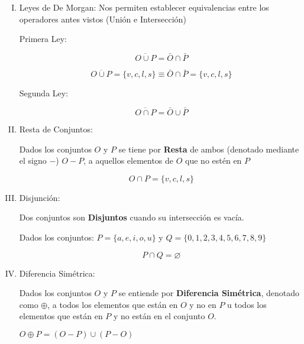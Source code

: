 \begin{enumerate}[I.]
{}\item Leyes de De Morgan: Nos permiten establecer equivalencias entre los 
operadores antes vistos (Unión e Intersección){

 Primera Ley:

\begin{equation}
\overline{O \cup P} = \bar{O} \cap \bar{P}
\end{equation}

\begin{equation}
\overline{O \cup P} = \{v,c,l,s\} \equiv \bar{O} \cap \bar{P} = \{v,c,l,s\}
\end{equation}


 Segunda Ley:

\begin{equation}
\overline{O \cap P} = \bar{O} \cup \bar{P}
\end{equation}

}\item Resta de Conjuntos:{

 Dados los conjuntos $O$ y $P$ se tiene por \textbf{Resta} de ambos 
(denotado
mediante el signo $-$) $O - P$, a aquellos elementos de $O$ que no estén en $P$

\begin{equation}
O \cap P = \{v,c,l,s\}
\end{equation}




}\item Disjunción:{

 Dos conjuntos son \textbf{Disjuntos} cuando su intersección es vacía.

\ejem Dados los conjuntos: $P = \{a,e,i,o,u\}$ y $Q = \{0,1,2,3,4,5,6,7,8,9\}$

\begin{equation}
P \cap Q = \varnothing
\end{equation}



}\item Diferencia Simétrica: {

 Dados los conjuntos $O$ y $P$ se entiende por \textbf{Diferencia Simétrica},
denotado como $\oplus$, a todos los elementos que están en $O$ y no en $P$ u
todos los elementos que están en $P$ y no están en el conjunto $O$.

\form $O \oplus P = (O - P) \cup (P - O)$

}
\end{enumerate}

